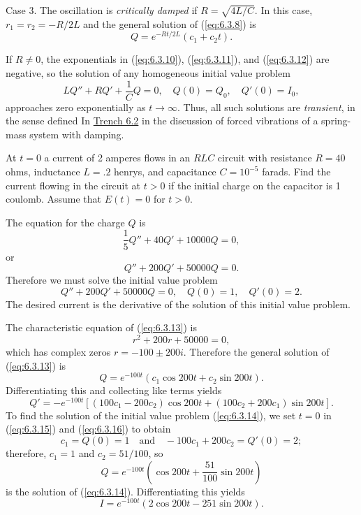 \documentclass{ximera}
\begin{document}
Case 3.
The oscillation is \textit{critically damped} if $R=\sqrt{4L/C}$. In
this case, $r_1=r_2=-R/2L$ and the general solution of (\ref{eq:6.3.8}) is
\begin{equation}\label{eq:6.3.12}
Q=e^{-Rt/2L}(c_1+c_2t).
\end{equation}

If $R\neq 0$, the exponentials in (\ref{eq:6.3.10}), (\ref{eq:6.3.11}),
and
(\ref{eq:6.3.12}) are negative, so the solution of any homogeneous initial
value problem
$$
 LQ''+RQ'+\frac{1}{C}Q=0,\quad Q(0)=Q_0,\quad Q'(0)=I_0,
$$
approaches zero exponentially as $t\rightarrow\infty$. Thus, all such
solutions are \textit{transient}, in the sense defined
In \href{https://ximera.osu.edu/ode/main/springProblemsII/springProblemsII}{Trench 6.2} in the discussion of forced vibrations of a
spring-mass system with damping.

\begin{example}\label{example:6.3.1}
At $t=0$ a current of 2 amperes flows in an $RLC$ circuit with
resistance $R=40$ ohms, inductance $L=.2$ henrys, and capacitance
$C=10^{-5}$ farads. Find the current flowing in the circuit at $t>0$
if the initial charge on the capacitor is 1 coulomb. Assume that
$E(t)=0$ for $t>0$.

\begin{explanation} The equation for the charge $Q$ is $$\frac{1}{5}Q''+40Q'+10000Q=0, $$ or
\begin{equation} \label{eq:6.3.13}
Q''+200Q'+50000Q=0.
\end{equation}
Therefore we must solve the initial value problem
\begin{equation} \label{eq:6.3.14}
Q''+200Q'+50000Q=0,\quad Q(0)=1,\quad Q'(0)=2.
\end{equation}
The desired current is the derivative of the solution of this initial
value problem.

The characteristic equation of (\ref{eq:6.3.13}) is
$$
r^2+200r+50000=0,
$$
which has complex zeros $r=-100\pm200i$. Therefore the general
solution of (\ref{eq:6.3.13}) is
\begin{equation} \label{eq:6.3.15}
Q=e^{-100t}(c_1\cos200t+c_2\sin200t).
\end{equation}
Differentiating this and collecting like terms yields
\begin{equation} \label{eq:6.3.16}
Q'=-e^{-100t}\left[(100c_1-200c_2)\cos200t+
(100c_2+200c_1)\sin200t\right].
\end{equation}
To find the solution of the initial value problem (\ref{eq:6.3.14}),
we set $t=0$ in (\ref{eq:6.3.15}) and (\ref{eq:6.3.16}) to obtain
$$
c_1=Q(0)=1\quad\mbox{and}\quad   -100c_1+200c_2=Q'(0)=2;
$$
therefore, $c_1=1$ and $c_2=51/100$, so
$$
Q=e^{-100t}\left(\cos200t+\frac{51}{100}\sin200t\right)
$$
is the solution of (\ref{eq:6.3.14}).
Differentiating this yields
$$
I=e^{-100t}(2\cos200t-251\sin200t).
$$
\end{explanation}
\end{example}
\end{document}
